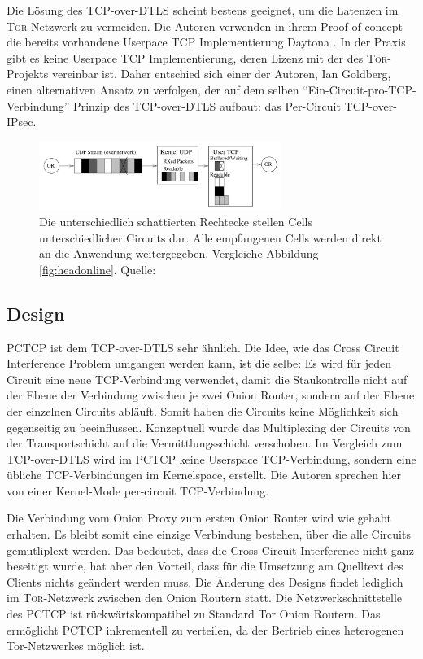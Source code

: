 \documentclass[fleqn,envcountsame,runningheads,10pt,a4paper]{llncs}
\begin{document}
Die Lösung des TCP-over-DTLS scheint bestens geeignet, um die Latenzen im \textsc{Tor}-Netzwerk zu vermeiden. Die Autoren verwenden in ihrem Proof-of-concept die bereits vorhandene Userpace TCP Implementierung Daytona \cite{daytona}. In der Praxis gibt es keine Userpace TCP Implementierung, deren Lizenz mit der des \textsc{Tor}-Projekts vereinbar ist. Daher entschied sich einer der Autoren, Ian Goldberg, einen alternativen Ansatz zu verfolgen, der auf dem selben ``Ein-Circuit-pro-TCP-Verbindung'' Prinzip des  TCP-over-DTLS aufbaut: das Per-Circuit TCP-over-IPsec. 

\begin{figure}[h]
  \begin{center}
    \includegraphics[width=0.7\textwidth]{pics/headonlinedtls.pdf}
    \caption{Die unterschiedlich schattierten Rechtecke stellen Cells unterschiedlicher Circuits dar. Alle empfangenen Cells werden direkt an die Anwendung weitergegeben. Vergleiche Abbildung \ref{fig:headonline}. Quelle:\cite{tcp-over-dtls}}
    \label{fig:headonlinedtls} 
  \end{center} 
\end{figure} 

\subsection{Design}

PCTCP ist dem TCP-over-DTLS sehr ähnlich. Die Idee, wie das Cross Circuit Interference Problem umgangen werden kann, ist die selbe: Es wird für jeden Circuit eine neue TCP-Verbindung verwendet, damit die Staukontrolle nicht auf der Ebene der Verbindung zwischen je zwei Onion Router, sondern auf der Ebene der einzelnen Circuits abläuft. Somit haben die Circuits keine Möglichkeit sich gegenseitig zu beeinflussen. Konzeptuell wurde das Multiplexing der Circuits von der Transportschicht auf die Vermittlungsschicht verschoben. Im Vergleich zum TCP-over-DTLS wird im PCTCP keine Userspace TCP-Verbindung, sondern eine übliche TCP-Verbindungen im Kernelspace, erstellt. Die Autoren sprechen hier von einer Kernel-Mode per-circuit TCP-Verbindung. 

Die Verbindung vom Onion Proxy zum ersten Onion Router wird wie gehabt erhalten. Es bleibt somit eine einzige Verbindung bestehen, über die alle Circuits gemutliplext werden. Das bedeutet, dass die Cross Circuit Interference nicht ganz beseitigt wurde, hat aber den Vorteil, dass für die Umsetzung am Quelltext des Clients nichts geändert werden muss. Die Änderung des Designs findet lediglich im \textsc{Tor}-Netzwerk zwischen den Onion Routern statt. Die Netzwerkschnittstelle des PCTCP ist rückwärtskompatibel zu Standard Tor Onion Routern. Das ermöglicht PCTCP inkrementell zu verteilen, da der Bertrieb eines heterogenen Tor-Netzwerkes möglich ist.
\end{document}
